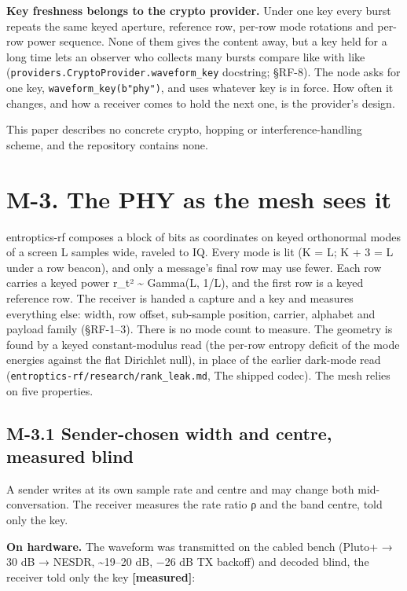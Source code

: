 \documentclass[10pt,letterpaper,twocolumn]{article}
\begin{document}
\textbf{Key freshness belongs to the crypto provider.} Under one key every burst repeats the same keyed aperture, reference row, per-row mode rotations and per-row power sequence. None of them gives the content away, but a key held for a long time lets an observer who collects many bursts compare like with like (\texttt{providers.\allowbreak{}CryptoProvider.\allowbreak{}waveform\_\allowbreak{}key} docstring; §RF-8). The node asks for one key, \texttt{waveform\_\allowbreak{}key(\allowbreak{}b"phy")\allowbreak{}}, and uses whatever key is in force. How often it changes, and how a receiver comes to hold the next one, is the provider's design.

This paper describes no concrete crypto, hopping or interference-handling scheme, and the repository contains none.

\section{M-3. The PHY as the mesh sees it}\label{m-3-the-phy-as-the-mesh-sees-it}

entroptics-rf composes a block of bits as coordinates on keyed orthonormal modes of a screen L samples wide, raveled to IQ. Every mode is lit (K = L; K + 3 = L under a row beacon), and only a message's final row may use fewer. Each row carries a keyed power r\_t² \textasciitilde{} Gamma(L, 1/L), and the first row is a keyed reference row. The receiver is handed a capture and a key and measures everything else: width, row offset, sub-sample position, carrier, alphabet and payload family (§RF-1--3). There is no mode count to measure. The geometry is found by a keyed constant-modulus read (the per-row entropy deficit of the mode energies against the flat Dirichlet null), in place of the earlier dark-mode read (\texttt{entroptics-{}\allowbreak{}rf/\allowbreak{}research/\allowbreak{}rank\_\allowbreak{}leak.\allowbreak{}md}, The shipped codec). The mesh relies on five properties.

\subsection{M-3.1 Sender-chosen width and centre, measured blind}\label{m-31-sender-chosen-width-and-centre-measured-blind}

A sender writes at its own sample rate and centre and may change both mid-conversation. The receiver measures the rate ratio ρ and the band centre, told only the key.

\textbf{On hardware.} The waveform was transmitted on the cabled bench (Pluto+ → 30 dB → NESDR, \textasciitilde19--20 dB, −26 dB TX backoff) and decoded blind, the receiver told only the key \textbf{{[}measured{]}}:
\end{document}
